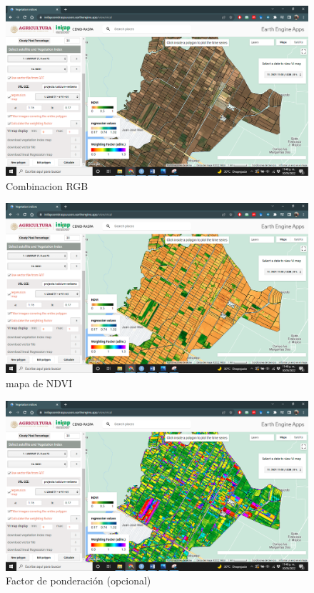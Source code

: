 \documentclass[
]{book}
\begin{document}
\begin{figure}

{\centering \includegraphics[width=0.85\linewidth]{./images/Figure51} 

}

\caption{Combinacion RGB}\label{fig:figI1}
\end{figure}

\begin{figure}

{\centering \includegraphics[width=0.85\linewidth]{./images/Figure52} 

}

\caption{mapa de NDVI}\label{fig:figI2}
\end{figure}

\begin{figure}

{\centering \includegraphics[width=0.85\linewidth]{./images/Figure53} 

}

\caption{Factor de ponderación (opcional)}\label{fig:figI3}
\end{figure}
\end{document}
